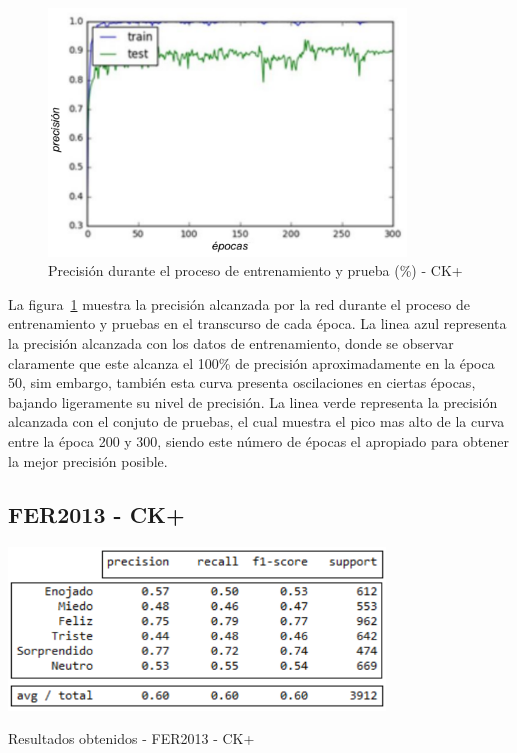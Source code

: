 \begin{figure}[H]
		\centering
		\includegraphics[width=95mm]{Imagenes/precision_ck+.pdf}
		\caption{Precisión durante el proceso de entrenamiento y prueba (\%) - CK+}
		\label{fig:precision-ck+}
\end{figure}

La figura~\ref{fig:precision-ck+} muestra la precisión alcanzada por la red durante el proceso de entrenamiento y pruebas en el transcurso de cada época. La linea azul representa la precisión alcanzada con los datos de entrenamiento, donde se observar claramente que este alcanza el 100\% de precisión aproximadamente en la época 50, sim embargo, también esta curva presenta oscilaciones en ciertas épocas, bajando ligeramente su nivel de precisión. La linea verde representa la precisión alcanzada con el conjuto de pruebas, el cual muestra el pico mas alto de la curva entre la época 200 y 300, siendo este número de épocas el apropiado para obtener la mejor precisión posible.

\subsection{FER2013 - CK+}

\begin{table}[H]
    \centering
    \includegraphics[width=100mm]{Imagenes/tabla_resultados_fer_ck+.png} 
    \caption{Resultados obtenidos - FER2013 - CK+}
    \label{tab:tabla_resultados_fer_ck+}
\end{table}

